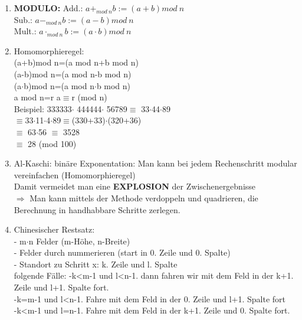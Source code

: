 \documentclass{scrartcl}
\begin{document}
\begin{enumerate}
    \item \textbf{MODULO:} Add.: $a+_{mod~ n}b:=(a+b) mod~ n$\\
    Sub.: $a-_{mod~ n}b:=(a-b) mod~ n$\\
    Mult.: $a\cdot_{mod~ n}b:=(a\cdot b) mod~ n$\\
    \item Homomorphieregel: \\
    (a+b)mod n=(a mod n+b mod n)\\
    (a-b)mod n=(a mod n-b mod n)\\
    (a$\cdot$b)mod n=(a mod n$\cdot$b mod n)\\
    a mod n=r a$\equiv$r (mod n)\\
    Beispiel: 333333$\cdot$ 444444$\cdot$ 56789$\equiv$ 33$\cdot$44$\cdot$89\\
    $\equiv$33$\cdot$11$\cdot$4$\cdot$89$\equiv$(330+33)$\cdot$(320+36) \\
    $\equiv$ 63$\cdot$56 $\equiv$ 3528\\
    $\equiv$ 28 (mod 100)
    \item Al-Kaschi: binäre Exponentation: Man kann bei jedem Rechenschritt modular vereinfachen (Homomorphieregel)\\
    Damit vermeidet man eine \textbf{EXPLOSION} der Zwischenergebnisse\\
    $\Rightarrow$ Man kann mittels der Methode verdoppeln und quadrieren, die Berechnung in handhabbare Schritte zerlegen.\\
    \item Chinesischer Restsatz: \\
    - m$\cdot$n Felder (m-Höhe, n-Breite)\\
    - Felder durch nummerieren (start in 0. Zeile und 0. Spalte)\\
    - Standort zu Schritt x: k. Zeile und l. Spalte\\
    folgende Fälle: -k<m-1 und l<n-1. dann fahren wir mit dem Feld in der k+1. Zeile \hspace*{75pt} und l+1. Spalte fort.\\
    \hspace*{75pt}-k=m-1 und l<n-1. Fahre mit dem Feld in der 0. Zeile und l+1. \hspace*{75pt}Spalte fort\\
    \hspace*{75pt}-k<m-1 und l=n-1. Fahre mit dem Feld in der k+1. Zeile und 0. \hspace*{75pt}Spalte fort.\\

\end{enumerate}
\end{document}
